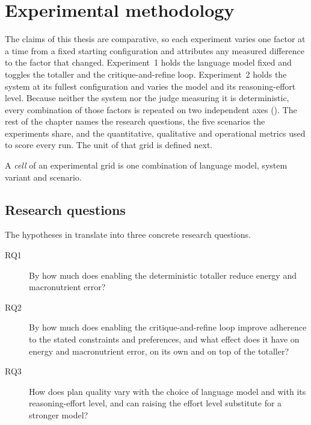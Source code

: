 \chapter{Experimental methodology}
\label{cha:methodology}

The claims of this thesis are comparative, so each experiment varies one factor at a time from a fixed starting configuration and attributes any measured difference to the factor that changed. Experiment~1 holds the language model fixed and toggles the totaller and the critique-and-refine loop. Experiment~2 holds the system at its fullest configuration and varies the model and its reasoning-effort level. Because neither the system nor the judge measuring it is deterministic, every combination of those factors is repeated on two independent axes (). The rest of the chapter names the research questions, the five scenarios the experiments share, and the quantitative, qualitative and operational metrics used to score every run. The unit of that grid is defined next.

\begin{definition}[Cell]
    \label{def:cell}
    A \emph{cell} of an experimental grid is one combination of language model, system variant and scenario.
\end{definition}

\section{Research questions}
\label{sec:methodology-research-questions}

The hypotheses in  translate into three concrete research questions.

\begin{description}
    \item[RQ1] By how much does enabling the deterministic totaller reduce energy and macronutrient error?
    \item[RQ2] By how much does enabling the critique-and-refine loop improve adherence to the stated constraints and preferences, and what effect does it have on energy and macronutrient error, on its own and on top of the totaller?
    \item[RQ3] How does plan quality vary with the choice of language model and with its reasoning-effort level, and can raising the effort level substitute for a stronger model?
\end{description}

